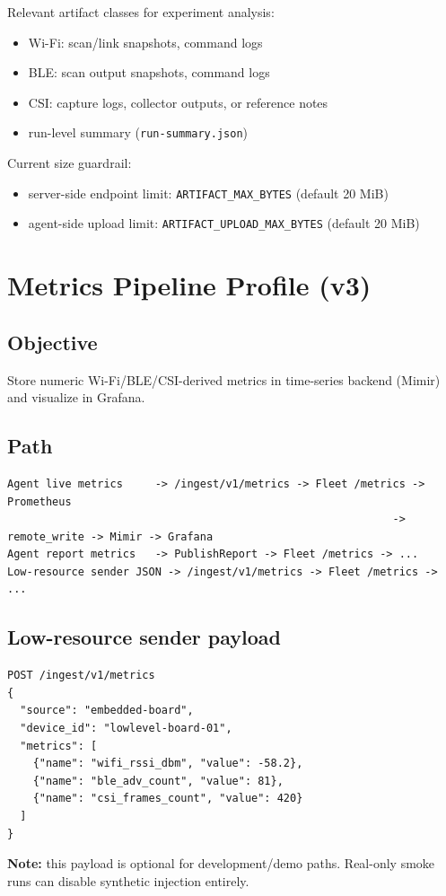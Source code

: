 \documentclass[11pt,a4paper]{article}
\begin{document}
Relevant artifact classes for experiment analysis:
\begin{itemize}
  \item Wi-Fi: scan/link snapshots, command logs
  \item BLE: scan output snapshots, command logs
  \item CSI: capture logs, collector outputs, or reference notes
  \item run-level summary (\texttt{run-summary.json})
\end{itemize}

Current size guardrail:
\begin{itemize}
  \item server-side endpoint limit: \texttt{ARTIFACT\_MAX\_BYTES} (default 20 MiB)
  \item agent-side upload limit: \texttt{ARTIFACT\_UPLOAD\_MAX\_BYTES} (default 20 MiB)
\end{itemize}

\section{Metrics Pipeline Profile (v3)}
\subsection{Objective}
Store numeric Wi-Fi/BLE/CSI-derived metrics in time-series backend (Mimir) and visualize in Grafana.

\subsection{Path}
\begin{verbatim}
Agent live metrics     -> /ingest/v1/metrics -> Fleet /metrics -> Prometheus
                                                            -> remote_write -> Mimir -> Grafana
Agent report metrics   -> PublishReport -> Fleet /metrics -> ...
Low-resource sender JSON -> /ingest/v1/metrics -> Fleet /metrics -> ...
\end{verbatim}

\subsection{Low-resource sender payload}
\begin{verbatim}
POST /ingest/v1/metrics
{
  "source": "embedded-board",
  "device_id": "lowlevel-board-01",
  "metrics": [
    {"name": "wifi_rssi_dbm", "value": -58.2},
    {"name": "ble_adv_count", "value": 81},
    {"name": "csi_frames_count", "value": 420}
  ]
}
\end{verbatim}
\textbf{Note:} this payload is optional for development/demo paths. Real-only smoke runs can disable synthetic injection entirely.
\end{document}
